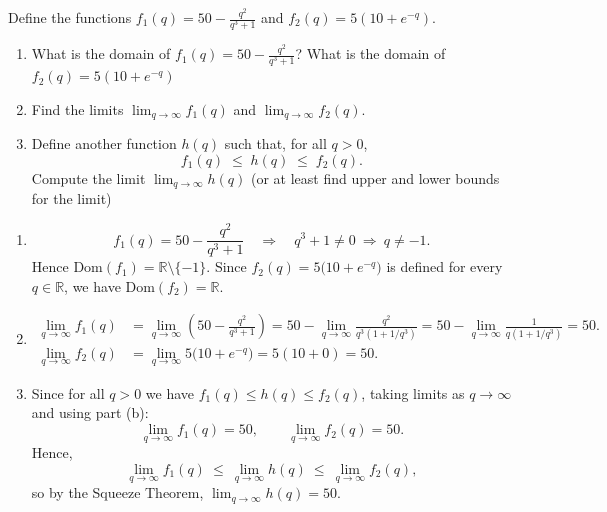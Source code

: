 \documentclass[11pt]{exam}
\begin{document}
\begin{questions}
\question[2]
    Define the functions $f_1(q) = 50 - \frac{q^2}{q^3+1}$ and $f_2(q) = 5(10 + e^{-q})$. 
    \begin{enumerate}[leftmargin=0.5cm,label=(\alph*),rightmargin=0.2cm]
        \item What is the domain of $f_1(q) = 50 - \frac{q^2}{q^3+1}$? What is the domain of $f_2(q) = 5(10 + e^{-q})$
        \item Find the limits $\lim_{q\rightarrow \infty} f_1(q)$ and $\lim_{q\rightarrow \infty} f_2(q)$.
        \item Define another function $h(q)$ such that, for all $q > 0$,
        \[
        f_1(q) \;\le\; h(q) \;\le\; f_2(q).
        \]
        Compute the limit $\lim_{q\rightarrow \infty} h(q)$ (or at least find upper and lower bounds for the limit)
    \end{enumerate}
    
\begin{solution}[0cm]
\begin{enumerate}[leftmargin=0.5cm,label=(\alph*),rightmargin=0.2cm]

  \item 
  \[
  f_1(q)=50-\frac{q^2}{q^3+1}\quad\Rightarrow\quad q^3+1\neq 0\ \Longrightarrow\ q\neq -1.
  \]
  Hence \(\mathrm{Dom}(f_1)=\mathbb{R}\setminus\{-1\}\).
  Since \(f_2(q)=5\big(10+e^{-q}\big)\) is defined for every \(q\in\mathbb{R}\), we have
  \(\mathrm{Dom}(f_2)=\mathbb{R}\).

  \item 
  \begin{align*}
      \lim_{q\to\infty} f_1(q)
      &= \lim_{q\to\infty}\!\left(50-\frac{q^2}{q^3+1}\right)
      = 50-\lim_{q\to\infty}\frac{q^2}{q^3(1+1/q^3)}
      = 50-\lim_{q\to\infty}\frac{1}{q(1+1/q^3)}
      = 50. \\
      \lim_{q\to\infty} f_2(q) 
      &= \lim_{q\to\infty} 5\big(10+e^{-q}\big)=5(10+0)=50.
    \end{align*}

  \item Since for all $q>0$ we have $f_1(q)\le h(q)\le f_2(q)$, taking limits as $q\to\infty$ and using part (b):
\[
\lim_{q\to\infty} f_1(q)=50,\qquad \lim_{q\to\infty} f_2(q)=50.
\]
Hence,
\[
\lim_{q\to\infty} f_1(q)\ \le\ \lim_{q\to\infty} h(q)\ \le\ \lim_{q\to\infty} f_2(q),
\]
so by the Squeeze Theorem, $\displaystyle \lim_{q\to\infty} h(q)=50$.

\end{enumerate}
\end{solution}



\end{questions}
\end{document}
